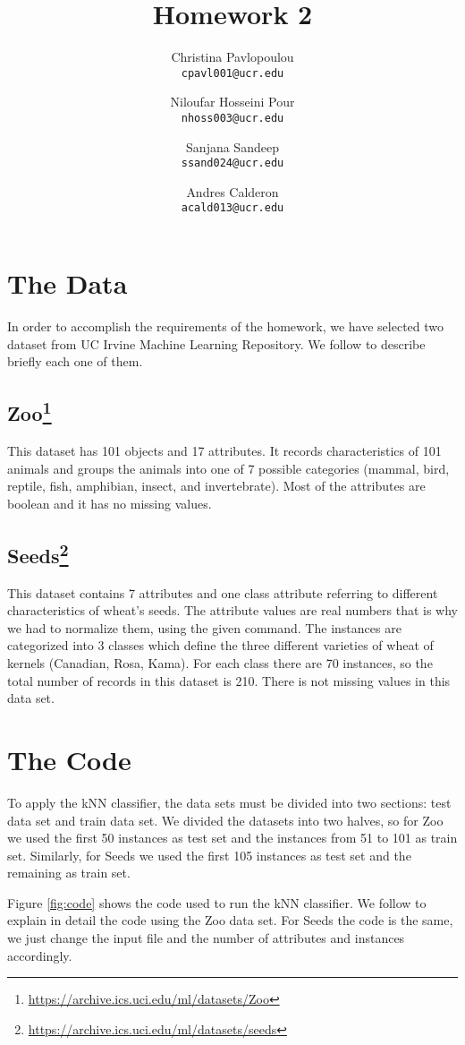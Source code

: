\documentclass[10pt]{scrartcl}
\title{Homework 2}
\author{
   Christina Pavlopoulou\\
  \small \texttt{cpavl001@ucr.edu}
  \and
   Niloufar Hosseini Pour\\
  \small \texttt{nhoss003@ucr.edu}
  \and
   Sanjana Sandeep \\
  \small \texttt{ssand024@ucr.edu}
  \and
   Andres Calderon\\
  \small \texttt{acald013@ucr.edu}
}
\begin{document}
\tiny
\maketitle
\normalsize

\section{The Data}
In order to accomplish the requirements of the homework, we have selected two dataset from UC Irvine Machine Learning Repository\cite{repo}.  We follow to describe briefly each one of them.

\subsection[Zoo]{Zoo\footnote{\url{https://archive.ics.uci.edu/ml/datasets/Zoo}}}
This dataset has 101 objects and 17 attributes. It records characteristics of 101 animals and groups the animals into one of 7 possible categories (mammal, bird, reptile, fish,
amphibian, insect, and invertebrate). Most of the attributes are boolean and it has no missing values.

\subsection[Seeds]{Seeds\footnote{\url{https://archive.ics.uci.edu/ml/datasets/seeds}}}\label{sec:seeds}
This dataset contains 7 attributes and one class attribute referring to different characteristics of wheat's seeds.  The attribute values are real numbers that is why we had to normalize them, using the given command. The instances are categorized into 3 classes which define the three different varieties of wheat of kernels (Canadian, Rosa, Kama). For each class there are 70 instances, so the total number of records in this dataset is 210. There is not missing values in this data set.

\section{The Code}
To apply the kNN classifier, the data sets must be divided into two sections: test data set and train data set.  We divided the datasets into two halves, so for Zoo we used the first 50 instances as test set and the instances from 51 to 101 as train set.  Similarly, for Seeds we used the first 105 instances as test set and the remaining as train set.  

Figure \ref{fig:code} shows the code used to run the kNN classifier.  We follow to explain in detail the code using the Zoo data set.  For Seeds the code is the same, we just change the input file and the number of attributes and instances accordingly.
\end{document}
